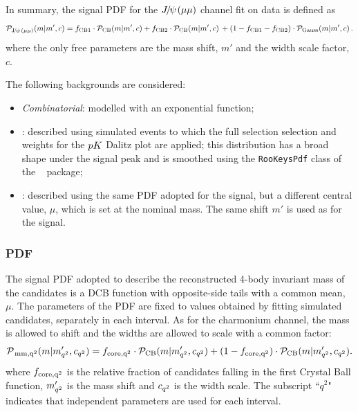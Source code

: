 In summary, the signal PDF for the $\jpsi(\mu\mu)$ channel fit on data is defined as
%
$$\mathcal{P}_{\rm \jpsi(\mu\mu)}(m | m', c) = 
f_{\rm CB1} \cdot \mathcal{P}_{\rm CB}(m | m', c) + 
f_{\rm CB2} \cdot \mathcal{P}_{\rm CB}(m | m', c) \, +
(1 - f_{\rm CB1} -f_{\rm CB2}) \cdot \mathcal{P}_{\rm Gauss}(m | m', c) \, .$$
%
where the only free parameters are the mass shift, $m'$ and the width scale factor, $c$.

\clearpage
The following backgrounds are considered:

\begin{itemize}

\item \textit{Combinatorial}: modelled with an exponential function;

\item \LbTopKJPsmm: described using simulated events to which the full selection selection and weights for the $p{K}$ Dalitz plot are applied; this distribution has a broad shape under the signal peak and is smoothed using the \verb!RooKeysPdf! class of the \roofit~\cite{Verkerke:2003ir} package;

\item \BsToKstJPsmm: described using the same PDF adopted for the signal, but a different central 
value, $\mu$, which is set at the \Bs nominal mass. The same shift $m'$  is used as for the signal.

\end{itemize}


\subsubsection{\BdToKstmm PDF}

The signal PDF adopted to describe the reconstructed 4-body invariant mass of the \BdToKstmm candidates 
is a DCB function with opposite-side tails with a common mean, $\mu$.
The parameters of the PDF are fixed to values obtained by fitting simulated candidates, separately in each \qsq interval.
As for the charmonium channel, the mass is allowed to shift and the widths are allowed to scale with a common factor:
%
$$\mathcal{P}_{\rm \rm \,mm, {q^2}}(m | m'_{{q^2}}, c_{{q^2}}) = 
f_{\rm core, {q^2}} \cdot \mathcal{P}_{\rm CB}(m | m'_{{q^2}}, c_{{q^2}}) + 
(1 - f_{\rm core, {q^2}}) \cdot \mathcal{P}_{\rm CB}(m | m'_{{q^2}}, c_{{q^2}}).$$
%
where $f_{\rm core, {q^2}}$ is the relative fraction of candidates falling in the first Crystal Ball function, $m'_{{q^2}}$ is the mass shift and $c_{{q^2}}$ is the width scale.
The subscript ``$q^2$" indicates that independent parameters are used for each \qsq interval.

